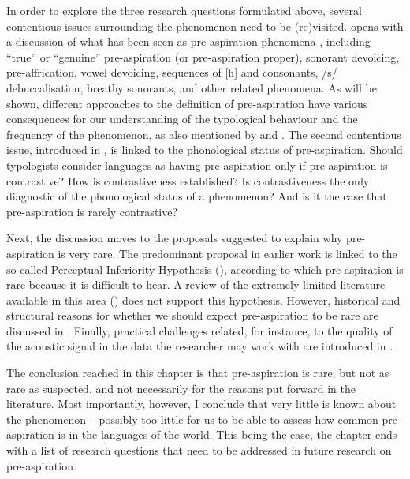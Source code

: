 \documentclass[output=paper]{langscibook}
\begin{document}
In order to explore the three research questions formulated above, several contentious issues surrounding the phenomenon need to be (re)visited.  opens with a discussion of what has been seen as pre\hyp aspiration phenomena \citep{Silverman2003}, including “true” or “genuine” pre\hyp aspiration (or pre\hyp aspiration proper), sonorant devoicing, pre-affrication, vowel devoicing, sequences of [h] and consonants, \mbox{/s/} debuccalisation, breathy sonorants, and other related phenomena. As will be shown, different approaches to the definition of pre\hyp aspiration have various consequences for our understanding of the typological behaviour and the frequency of the phenomenon, as also mentioned by \citet[32]{Clayton2010} and . The second contentious issue, introduced in , is linked to the phonological status of pre-aspiration. Should typologists consider languages as having pre\hyp aspiration only if pre\hyp aspiration is contrastive? How is contrastiveness established? Is contrastiveness the only diagnostic of the phonological status of a phenomenon? And is it the case that pre\hyp aspiration is rarely contrastive?

Next, the discussion moves to the proposals suggested to explain why pre\hyp aspiration is very rare. The predominant proposal in earlier work is linked to the so-called Perceptual Inferiority Hypothesis (\citealt{Silverman2003, Clayton2010}), according to which pre\hyp aspiration is rare because it is difficult to hear. A review of the extremely limited literature available in this area () does not support this hypothesis. However, historical and structural reasons for whether we should expect pre\hyp aspiration to be rare are discussed in . Finally, practical challenges related, for instance, to the quality of the acoustic signal in the data the researcher may work with are introduced in .

The conclusion reached in this chapter is that pre\hyp aspiration is rare, but not as rare as suspected, and not necessarily for the reasons put forward in the literature. Most importantly, however, I conclude that very little is known about the phenomenon – possibly too little for us to be able to assess how common pre\hyp aspiration is in the languages of the world. This being the case, the chapter ends with a list of research questions that need to be addressed in future research on pre-aspiration.
\end{document}
